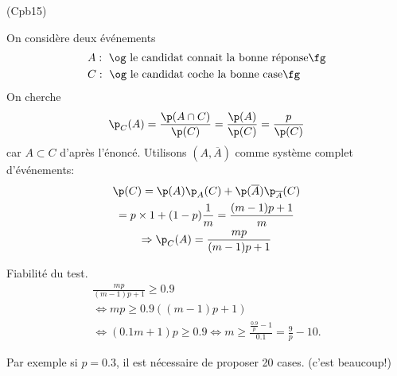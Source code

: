 \begin{tiny}(Cpb15)\end{tiny} On considère deux événements
\[
  \begin{aligned}
    &A: \text{ \og le candidat connait la bonne réponse\fg}\\
    &C: \text{ \og le candidat coche la bonne case\fg}
  \end{aligned}
\]
On cherche
\[
  \p_C(A) = \frac{\p(A\cap C)}{\p(C)}
  =\frac{\p(A)}{\p(C)}
  = \frac{p}{\p(C)}
\]
car $A \subset C$ d'après l'énoncé. Utilisons $(A, \overline{A})$ comme système complet d'événements:
\begin{multline*}
  \p(C) = \p(A)\p_A(C) + \p(\overline{A})\p_{\overline{A}}(C)\\
  = p \times 1 + (1 - p)\frac{1}{m}
  = \frac{(m-1)p+1}{m} \\
\Rightarrow 
\p_C(A) = \frac{mp}{(m-1)p+1}
\end{multline*}

Fiabilité du test.
\begin{multline*}
  \frac{mp}{(m-1)p+1} \geq 0.9 \\
  \Leftrightarrow
  m p\geq 0.9((m-1)p + 1)\\
  \Leftrightarrow
  (0.1 m +1)p \geq 0.9
  \Leftrightarrow
  m \geq \frac{\frac{0.9}{p} -1}{0.1}
  = \frac{9}{p} -10.
\end{multline*}

Par exemple si $p=0.3$, il est nécessaire de proposer 20 cases. (c'est beaucoup!)

